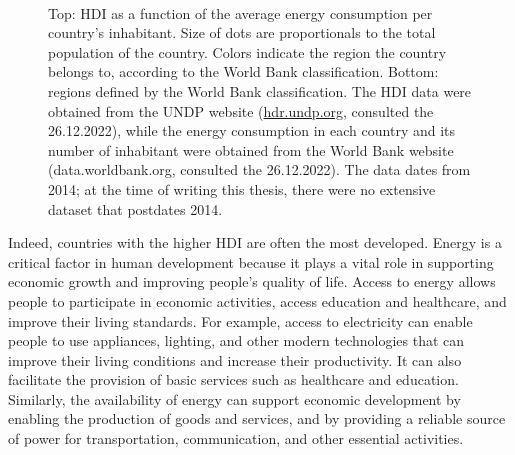 \documentclass[my_thesis.tex]{subfiles}
\begin{document}
\begin{figure}
    \centering
    \\
    \centering
    \caption{Top: HDI as a function of the average energy consumption per country's inhabitant. Size of dots are proportionals to the total population of the country. Colors indicate the region the country belongs to, according to the World Bank classification. Bottom: regions defined by the World Bank classification. The HDI data were obtained from the UNDP website (\url{hdr.undp.org}, consulted the 26.12.2022), while the energy consumption in each country and its number of inhabitant were obtained from the World Bank website (data.worldbank.org, consulted the 26.12.2022). The data dates from 2014; at the time of writing this thesis, there were no extensive dataset that postdates 2014.}
    \label{fig.hdi}
\end{figure}

Indeed, countries with the higher HDI are often the most developed. Energy is a critical factor in human development because it plays a vital role in supporting economic growth and improving people's quality of life. Access to energy allows people to participate in economic activities, access education and healthcare, and improve their living standards. For example, access to electricity can enable people to use appliances, lighting, and other modern technologies that can improve their living conditions and increase their productivity. It can also facilitate the provision of basic services such as healthcare and education. Similarly, the availability of energy can support economic development by enabling the production of goods and services, and by providing a reliable source of power for transportation, communication, and other essential activities.
\end{document}
